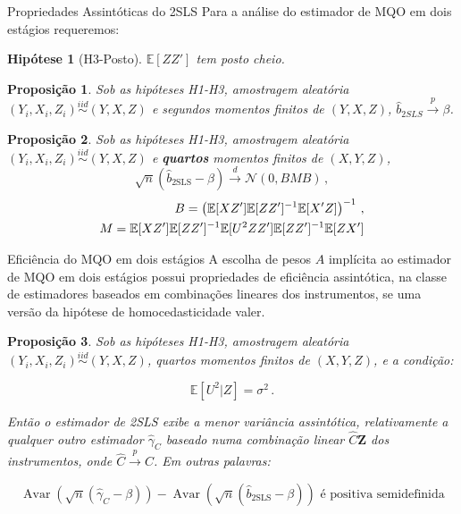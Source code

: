 \documentclass[11pt]{beamer}
\newtheorem{proposition}{Proposição}
\newtheorem{assumption}{Hipótese}
\begin{document}
\begin{frame}{Propriedades Assintóticas do 2SLS}
	Para a análise do estimador de MQO em dois estágios requeremos:
	\begin{assumption}[H3-Posto]
		$\mathbb{E}[ZZ']$ tem posto cheio.
	\end{assumption}
	\begin{proposition}
		Sob as hipóteses H1-H3, amostragem aleatória $(Y_i,X_i,Z_i) \overset{iid}{\sim}(Y,X,Z)$ e segundos momentos finitos de $(Y,X,Z)$, $\hat{b}_{2SLS}\overset{p}{\to}\beta$.
	\end{proposition}
		\begin{proposition}
		Sob as hipóteses H1-H3, amostragem aleatória $(Y_i,X_i,Z_i) \overset{iid}{\sim}(Y,X,Z)$ e \textbf{quartos} momentos finitos de $(X,Y,Z)$, 
		\vspace{-0.4em}
		$$\sqrt{n}(\hat{b}_{\text{2SLS}}-\beta) \overset{d}{\to}\mathcal{N}(0,BMB)\, ,$$
		\vspace{-2.4em}
	\begin{align*}
		\footnotesize B=\left(\mathbb{E}[XZ']\mathbb{E}[ZZ']^{-1}\mathbb{E}[X'Z]\right)^{-1}\, , \\ M = \mathbb{E}[XZ']\mathbb{E}[ZZ']^{-1}\mathbb{E}[U^2 ZZ']\mathbb{E}[ZZ']^{-1}\mathbb{E}[ZX']
	\end{align*}
	\end{proposition}
\end{frame}

\begin{frame}{Eficiência do MQO em dois estágios}
A escolha de pesos $A$ implícita ao estimador de MQO em dois estágios possui propriedades de eficiência assintótica, na classe de estimadores baseados em combinações lineares dos instrumentos, se uma versão da hipótese de homocedasticidade valer.

\begin{proposition}
	Sob as hipóteses H1-H3, amostragem aleatória $(Y_i,X_i,Z_i) \overset{iid}{\sim}(Y,X,Z)$, quartos momentos finitos de $(X,Y,Z)$, e a condição:
	
	$$\mathbb{E}[U^2|Z] = \sigma^2\, .$$ 

	Então o estimador de 2SLS exibe a menor variância assintótica, relativamente a qualquer outro estimador $\hat{\gamma}_C$ baseado numa combinação linear $\hat{C}\boldsymbol{Z}$ dos instrumentos, onde $\hat{C} \overset{p}{\to} C$. Em outras palavras:
	
	$$\operatorname{Avar}(\sqrt{n}(\hat{\gamma}_{C}-\beta)) - \operatorname{Avar}(\sqrt{n}(\hat{b}_{\text{2SLS}}-\beta)) \text{ é positiva semidefinida}$$
\end{proposition}
\end{frame}
\end{document}
